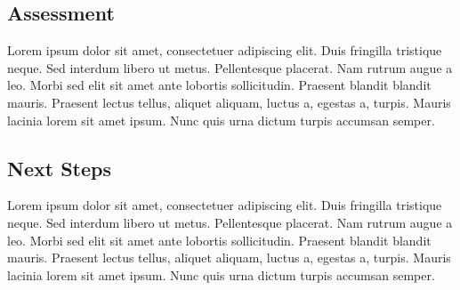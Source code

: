 \documentclass[journal]{IEEEtran}
\begin{document}
\subsection{Assessment}
Lorem ipsum dolor sit amet, consectetuer adipiscing elit.
Duis fringilla tristique neque. Sed interdum libero ut metus. Pellentesque placerat. Nam rutrum augue a leo.
Morbi sed elit sit amet ante lobortis sollicitudin. Praesent blandit blandit mauris. Praesent lectus tellus,
aliquet aliquam, luctus a, egestas a, turpis. Mauris lacinia lorem sit amet ipsum. Nunc quis urna dictum
turpis accumsan semper.
\subsection{Next Steps}
Lorem ipsum dolor sit amet, consectetuer adipiscing elit.
Duis fringilla tristique neque. Sed interdum libero ut metus. Pellentesque placerat. Nam rutrum augue a leo.
Morbi sed elit sit amet ante lobortis sollicitudin. Praesent blandit blandit mauris. Praesent lectus tellus,
aliquet aliquam, luctus a, egestas a, turpis. Mauris lacinia lorem sit amet ipsum. Nunc quis urna dictum
turpis accumsan semper.




%
%

\end{document}
